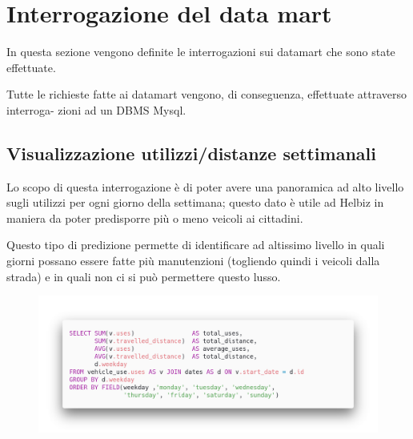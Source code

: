 \chapter{Interrogazione del data mart}
In questa sezione vengono definite le interrogazioni sui datamart che sono state effettuate.

Tutte le richieste fatte ai datamart vengono, di conseguenza, effettuate attraverso interroga-
zioni ad un DBMS Mysql.

\section{Visualizzazione utilizzi/distanze settimanali}
Lo scopo di questa interrogazione è di poter avere una panoramica ad alto livello
sugli utilizzi per ogni giorno della settimana; questo dato è utile ad 
Helbiz in maniera da poter predisporre più o meno veicoli ai cittadini.

Questo tipo di predizione permette di identificare ad altissimo livello
in quali giorni possano essere fatte più manutenzioni (togliendo quindi i veicoli dalla strada)
e in quali non ci si può permettere questo lusso.
\begin{figure}[H]                                                                                                                                                            
\centering                                                                                                                                                                   
\includegraphics[width=\textwidth]{images/query1}                                                                                                                                   
\label{fig:query1}                                                                                                                                                           
\end{figure}

